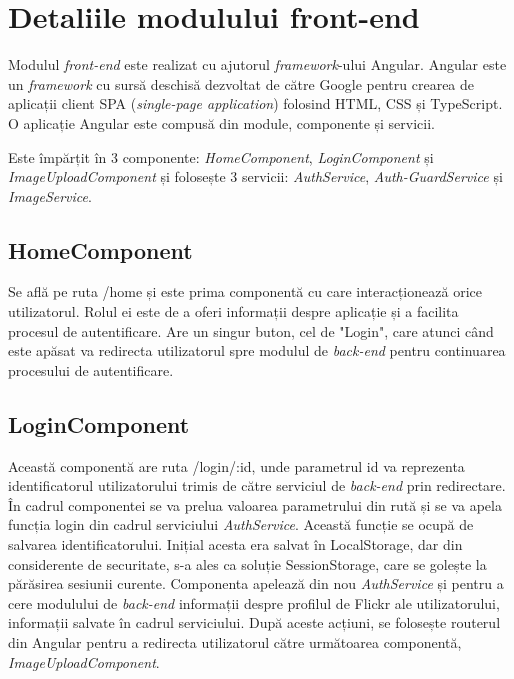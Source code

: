 \section{Detaliile modulului front-end}
Modulul \textit{front-end} este realizat cu ajutorul \textit{framework}-ului Angular. Angular este un \textit{framework} cu sursă deschisă dezvoltat de către Google pentru crearea de aplicații client  SPA (\textit{single-page application}) folosind HTML, CSS și TypeScript. O aplicație Angular este compusă din module, componente și servicii.


Este împărțit în 3 componente\cite{angular-components}: \textit{HomeComponent}, \textit{LoginComponent} și \textit{ImageUploadComponent} și folosește 3 servicii: \textit{AuthService}, \textit{Auth-GuardService} și \textit{ImageService}.

\subsection{HomeComponent}
 Se află pe ruta /home și este prima componentă cu care interacționează orice utilizatorul. Rolul ei este de a oferi informații despre aplicație și a facilita procesul de autentificare. Are un singur buton, cel de "Login", care atunci când este apăsat va redirecta utilizatorul spre modulul de \textit{back-end} pentru continuarea procesului de autentificare.
 
 \subsection{LoginComponent}
 Această componentă are ruta /login/:id, unde parametrul id va reprezenta identificatorul utilizatorului trimis de către serviciul de \textit{back-end} prin redirectare. În cadrul componentei se va prelua valoarea parametrului din rută și se va apela funcția login din cadrul serviciului \textit{AuthService}. Această funcție se ocupă de salvarea identificatorului. Inițial acesta era salvat în LocalStorage, dar din considerente de securitate, s-a ales ca soluție SessionStorage, care se golește la părăsirea sesiunii curente. Componenta apelează din nou \textit{AuthService} și pentru a cere modulului de \textit{back-end} informații despre profilul de Flickr ale utilizatorului, informații salvate în cadrul serviciului. După aceste acțiuni, se folosește routerul din Angular pentru a redirecta utilizatorul către următoarea componentă, \textit{ImageUploadComponent}.
 
